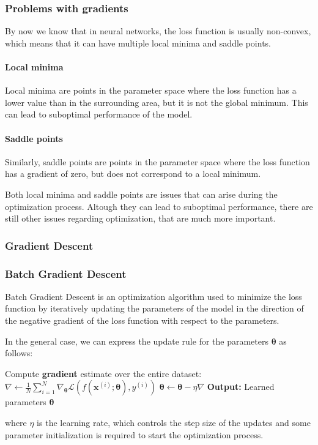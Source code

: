 \subsubsection{Problems with gradients}
By now we know that in neural networks, the loss function is usually non-convex, which means that it can have multiple local minima and saddle points.

\paragraph{Local minima} Local minima are points in the parameter space where the loss function has a lower value than in the surrounding area,
but it is not the global minimum. This can lead to suboptimal performance of the model.

\paragraph{Saddle points} Similarly, saddle points are points in the parameter space where the loss function has a gradient of zero,
but does not correspond to a local minimum.

Both local minima and saddle points are issues that can arise during the optimization process. Altough they can lead to suboptimal performance,
there are still other issues regarding optimization, that are much more important.
\subsubsection{Gradient Descent}

\subsubsection*{Batch Gradient Descent}
Batch Gradient Descent is an optimization algorithm used to minimize the loss function by iteratively updating the parameters of the model
in the direction of the negative gradient of the loss function with respect to the parameters.

In the general case, we can express the update rule for the parameters $\boldsymbol{\theta}$ as follows:

\begin{algorithm}[H]
    \caption{Batch Gradient Descent}
    \begin{algorithmic}[1]
            \State Compute \textbf{gradient} estimate over the entire dataset:
            \State $\nabla \leftarrow \frac{1}{N} \sum\limits_{i=1}^{N} \nabla_{\boldsymbol{\theta}} \mathcal{L}(f(\boldsymbol{x}^{(i)}; \boldsymbol{\theta}), y^{(i)})$
            \State $\boldsymbol{\theta} \leftarrow \boldsymbol{\theta} - \eta \nabla$
        \EndWhile
        \State \textbf{Output:} Learned parameters $\boldsymbol{\theta}$
    \end{algorithmic}
\end{algorithm}
where $\eta$ is the learning rate, which controls the step size of the updates and some parameter initialization is required to start the optimization process.


